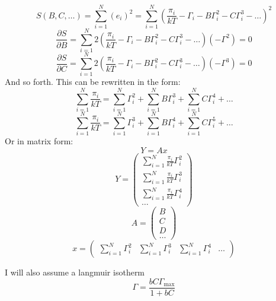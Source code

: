 \documentclass{article}
\begin{document}
\[S(B,C,\ldots) = \sum_{i=1}^N (e_i)^2 = \sum_{i=1}^N (\frac{\pi_i}{kT} -  \Gamma_i - B\Gamma_i^2 - C\Gamma_i^3 - \ldots)^2\]
\[\frac{\partial S}{\partial B} = \sum_{i=1}^N 2(\frac{\pi_i}{kT} -  \Gamma_i - B\Gamma_i^2 - C\Gamma_i^3 - \ldots)(-\Gamma^2)=0\]
\[\frac{\partial S}{\partial C} = \sum_{i=1}^N 2(\frac{\pi_i}{kT} -  \Gamma_i - B\Gamma_i^2 - C\Gamma_i^3 - \ldots)(-\Gamma^3)=0\]
And so forth. This can be rewritten in the form:
\[\sum_{i=1}^N \frac{\pi_i}{kT} = \sum_{i=1}^N \Gamma_i^2 + \sum_{i=1}^N B\Gamma_i^3 + \sum_{i=1}^N C\Gamma_i^4 + \ldots \]
\[\sum_{i=1}^N \frac{\pi_i}{kT} = \sum_{i=1}^N \Gamma_i^3 + \sum_{i=1}^N B\Gamma_i^4 + \sum_{i=1}^N C\Gamma_i^5 + \ldots \]
Or in matrix form: \[Y = Ax\] \[Y = \begin{pmatrix}
\sum_{i=1}^N \frac{\pi_i}{kT}\Gamma_i^2\\
\sum_{i=1}^N \frac{\pi_i}{kT}\Gamma_i^3\\
\sum_{i=1}^N \frac{\pi_i}{kT}\Gamma_i^4\\ \ldots\end{pmatrix}\]
\[A = \begin{pmatrix}B \\ C \\ D \\ \ldots\end{pmatrix}\]
\[x = \begin{pmatrix}\sum_{i=1}^N \Gamma_i^2 & \sum_{i=1}^N\Gamma_i^3 & \sum_{i=1}^N\Gamma_i^4 & \ldots\end{pmatrix}\]

I will also assume a langmuir isotherm
\[\Gamma = \frac{b C \Gamma_\mathrm{max}}{1 + b C}\]
\end{document}
